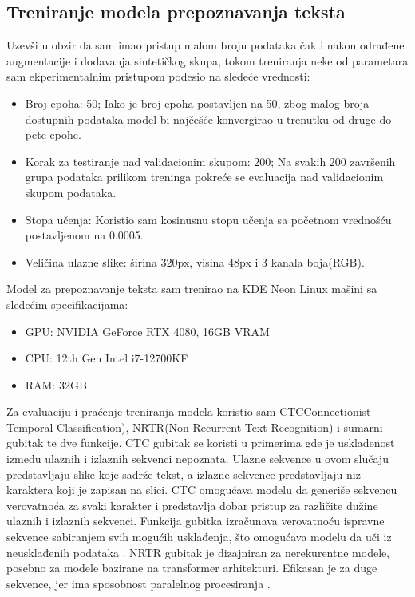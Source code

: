 \documentclass[a4paper,12pt]{article}
\begin{document}
	\subsection{Treniranje modela prepoznavanja teksta}
	Uzevši u obzir da sam imao pristup malom broju podataka čak i nakon odrađene augmentacije i dodavanja sintetičkog skupa, tokom treniranja neke od parametara sam ekperimentalnim pristupom podesio na sledeće vrednosti:
	\begin{itemize}
		\item Broj epoha: 50; Iako je broj epoha postavljen na 50, zbog malog broja dostupnih podataka model bi najčešće konvergirao u trenutku od druge do pete epohe.
		\item Korak za testiranje nad validacionim skupom: 200; Na svakih 200 završenih grupa podataka prilikom treninga pokreće se evaluacija nad validacionim skupom podataka.
		\item {}Stopa učenja: Koristio sam kosinusnu stopu učenja sa početnom vrednošću postavljenom na 0.0005.
		\item Veličina ulazne slike: širina 320px, visina 48px i 3 kanala boja(RGB).
	\end{itemize}
	
	Model za prepoznavanje teksta sam trenirao na KDE Neon Linux mašini sa sledećim specifikacijama:
	\begin{itemize}
		\item GPU: NVIDIA GeForce RTX 4080, 16GB VRAM
		\item CPU: 12th Gen Intel i7-12700KF
		\item RAM: 32GB
	\end{itemize}

	Za evaluaciju i praćenje treniranja modela koristio sam CTCConnectionist Temporal Classification), NRTR(Non-Recurrent Text Recognition) i sumarni gubitak te dve funkcije. CTC gubitak se koristi u primerima gde je usklađenost između ulaznih i izlaznih sekvenci nepoznata. Ulazne sekvence u ovom slučaju predstavljaju slike koje sadrže tekst, a izlazne sekvence predstavljaju niz karaktera koji je zapisan na slici. CTC omogućava modelu da generiše sekvencu verovatnoća za svaki karakter i predstavlja dobar pristup za različite dužine ulaznih i izlaznih sekvenci. Funkcija gubitka izračunava verovatnoću ispravne sekvence sabiranjem svih mogućih usklađenja, što omogućava modelu da uči iz neusklađenih podataka \cite{inproceedings, ctcLoss}. NRTR gubitak je dizajniran za nerekurentne modele, posebno za modele bazirane na transformer arhitekturi. Efikasan je za duge sekvence, jer ima sposobnost paralelnog procesiranja \cite{hu2020gtcguidedtrainingctc}.
	
\end{document}
